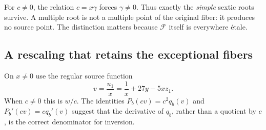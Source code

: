 \documentclass[11pt,a4paper]{article}
\theoremstyle{definition}
\newcommand{\F}{\mathcal F}
\begin{document}
For $c\ne0$, the relation $c=x\gamma$ forces $\gamma\ne0$.
Thus exactly the \emph{simple} sextic roots survive. A multiple root is
not a multiple point of the original fiber: it produces no source point.
The distinction matters because $\F$ itself is everywhere \'etale.

\subsection{A rescaling that retains the exceptional fibers}
On $x\ne0$ use the regular source function
\begin{equation}\label{eq:vforward}
 v=\frac{u_1}{x}=\frac1x+27y-5xz_1.
\end{equation}
When $c\ne0$ this is $w/c$. The identities $P_b(cv)=c^2q_b(v)$ and
$P_b'(cv)=cq_b'(v)$ suggest that the derivative of $q_b$, rather than
a quotient by $c$, is the correct denominator for inversion.
\end{document}

